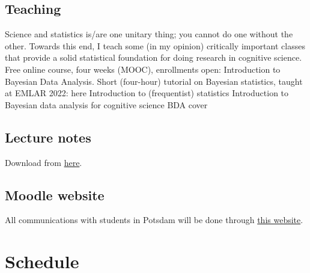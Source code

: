 \documentclass[
  letterpaper,
  DIV=11,
  numbers=noendperiod]{scrreprt}
\begin{document}
\section{Teaching}\label{teaching}

Science and statistics is/are one unitary thing; you cannot do one
without the other. Towards this end, I teach some (in my opinion)
critically important classes that provide a solid statistical foundation
for doing research in cognitive science. Free online course, four weeks
(MOOC), enrollments open: Introduction to Bayesian Data Analysis. Short
(four-hour) tutorial on Bayesian statistics, taught at EMLAR 2022: here
Introduction to (frequentist) statistics Introduction to Bayesian data
analysis for cognitive science BDA cover

\section{Lecture notes}\label{lecture-notes}

Download from
\href{https://drive.google.com/drive/folders/1H-jQNOqS3PLgdXADRYF7ag-WqN_tK4qc?usp=share_link}{here}.

\section{Moodle website}\label{moodle-website}

All communications with students in Potsdam will be done through
\href{https://moodle2.uni-potsdam.de/course/view.php?id=17526}{this
website}.


\chapter{Schedule}\label{schedule}
\end{document}

